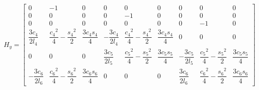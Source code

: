 \documentclass[a4paper,10pt,fleqn]{article}
\begin{document}
\begin{gather}
H_y=
\begin{bmatrix}
	0                   & -1                                    & 0                  & 0                   & 0                                     & 0                  & 0                   & 0                                     & 0                  \\
	0                   & 0                                     & 0                  & 0                   & -1                                    & 0                  & 0                   & 0                                     & 0                  \\
	0                   & 0                                     & 0                  & 0                   & 0                                     & 0                  & 0                   & -1                                    & 0                  \\
	\dfrac{3c_4}{2l_4}  & \dfrac{{c_4}^2}{4}-\dfrac{{s_4}^2}{2} & \dfrac{3c_4s_4}{4} & -\dfrac{3c_4}{2l_4} & \dfrac{{c_4}^2}{4}-\dfrac{{s_4}^2}{2} & \dfrac{3c_4s_4}{4} & 0                   & 0                                     & 0                  \\
	0                   & 0                                     & 0                  & \dfrac{3c_5}{2l_5}  & \dfrac{{c_5}^2}{4}-\dfrac{{s_5}^2}{2} & \dfrac{3c_5s_5}{4} & -\dfrac{3c_5}{2l_5} & \dfrac{{c_5}^2}{4}-\dfrac{{s_5}^2}{2} & \dfrac{3c_5s_5}{4} \\
	-\dfrac{3c_6}{2l_6} & \dfrac{{c_6}^2}{4}-\dfrac{{s_6}^2}{2} & \dfrac{3c_6s_6}{4} & 0                   & 0                                     & 0                  & \dfrac{3c_6}{2l_6}  & \dfrac{{c_6}^2}{4}-\dfrac{{s_6}^2}{2} & \dfrac{3c_6s_6}{4}
\end{bmatrix}
\end{gather}
\end{document}
